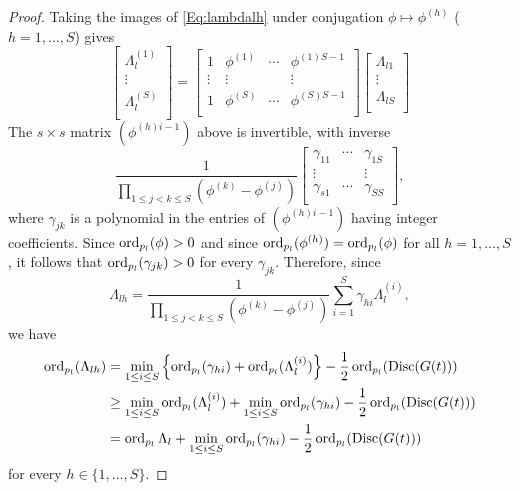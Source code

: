 \begin{proof}
Taking the images of \eqref{Eq:lambdalh} under conjugation $\phi \mapsto \phi^{(h)}$ ($h = 1, \dots, S$) gives
\[\begin{bmatrix}
\Lambda_l^{(1)} \\
\vdots \\
\Lambda_l^{(S)}	\\
\end{bmatrix}
=
\begin{bmatrix}
1 		& \phi^{(1)} 	& \cdots 	& \phi^{(1)S-1}\\
\vdots 	& \vdots 		& 		& \vdots \\
1 		& \phi^{(S)} 	& \cdots  	& \phi^{(S)S-1}\\
\end{bmatrix}
\begin{bmatrix}
\Lambda_{l1}\\
\vdots \\
\Lambda_{lS}\\
\end{bmatrix}\]
The $s \times s$ matrix $(\phi^{(h)i-1})$ above is invertible, with inverse
\[\frac{1}{\displaystyle \prod_{1\leq j<k\leq S} (\phi^{(k)} - \phi^{(j)})}
\begin{bmatrix}
\gamma_{11} 	& \cdots 	& \gamma_{1S}\\
\vdots 		& 		& \vdots\\
\gamma_{s1} 	& \cdots 	& \gamma_{SS}\\
\end{bmatrix},\]
where $\gamma_{jk}$ is a polynomial in the entries of $(\phi^{(h)i-1})$ having integer coefficients. Since $\operatorname{ord}_{p_l}(\phi) > 0$ and since $\operatorname{ord}_{p_l}(\phi^{(h)}) = \operatorname{ord}_{p_l}(\phi)$ for all $h = 1, \dots, S$, it follows that $\operatorname{ord}_{p_l}(\gamma_{jk}) > 0 $ for every $\gamma_{jk}$. Therefore, since 
\[\Lambda_{lh} = \frac{1}{\displaystyle \prod_{1\leq j<k\leq S}(\phi^{(k)} - \phi^{(j)})}\sum_{i = 1}^S \gamma_{hi}\Lambda_l^{(i)},\]
we have 
\[\begin{split}
\operatorname{ord}_{p_l}(\Lambda_{lh}) 
	& = \min_{1 \leq i \leq S} \left\{\operatorname{ord}_{p_l}(\gamma_{hi}) + \operatorname{ord}_{p_l}(\Lambda_l^{(i)})\right\} -\frac{1}{2}\operatorname{ord}_{p_l}(\text{Disc}(G(t)))\\
	& \geq \min_{1 \leq i \leq S} \operatorname{ord}_{p_l}(\Lambda_l^{(i)}) +  \min_{1 \leq i \leq S} \operatorname{ord}_{p_l}(\gamma_{hi}) - \frac{1}{2}\operatorname{ord}_{p_l}(\text{Disc}(G(t)))\\
	& = \operatorname{ord}_{p_l}\Lambda_l + \min_{1 \leq i \leq S} \operatorname{ord}_{p_l}(\gamma_{hi}) - \frac{1}{2}\operatorname{ord}_{p_l}(\text{Disc}(G(t)))
\end{split}\]
for every $h \in \{1, \dots, S\}$. 
\end{proof}

